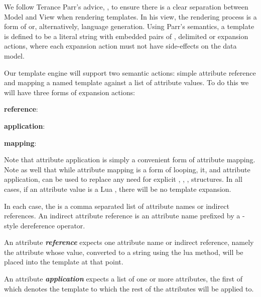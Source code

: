 
\startchapter[title=A Lua Rendering Engine]

We follow Terance Parr's advice, \cite{parr2004templateMVC}, to ensure 
there is a clear separation between Model and View when rendering 
templates. In his view, the rendering process is a form of 
 or, alternatively, language generation. Using Parr's 
 semantics, a template is defined to be a literal string with 
embedded pairs of \quote{\{\{}, \quote{\}\}} delimited  or 
expansion actions, where each expansion action must not have side-effects 
on the data model. 

Our template engine will support two semantic actions: simple attribute 
reference and mapping a named template against a list of attribute values. 
To do this we will have three forms of expansion actions: 

\startitemize
\item {\bf reference}:  

\item {\bf application}: 

\item {\bf mapping}: 

\stopitemize

Note that attribute application is simply a convenient form of attribute 
mapping. Note as well that while attribute mapping is a form of  
 looping, it, and attribute application, can be used to replace 
any need for explicit , , ,  
structures. In all cases, if an attribute value is a Lua , there 
will be no template expansion. 

In each case, the  is a comma separated list of 
attribute names or indirect references. An indirect attribute reference is 
an attribute name prefixed by a -style \quote{*} dereference 
operator.

An attribute \emph{\bf reference} expects one attribute name or indirect 
reference, namely the attribute whose value, converted to a string using 
the lua  method, will be placed into the template 
 at that point. 

An attribute \emph{\bf application} expects a list of one or more attributes, 
the first of which denotes the template to which the rest of the 
attributes will be applied to.

